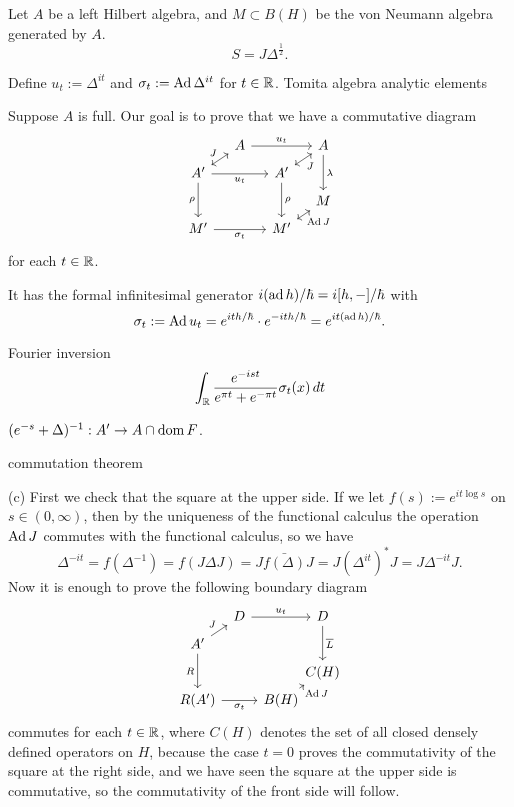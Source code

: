 \documentclass{../../large}
\begin{document}
\begin{prb}
Let $A$ be a left Hilbert algebra, and $M\subset B(H)$ be the von Neumann algebra generated by $A$.
\[S=J\Delta^{\frac12}.\]


Define $u_t:=\Delta^{it}$ and $\sigma_t:=\operatorname{Ad}\Delta^{it}$ for $t\in\mathbb{R}$.
Tomita algebra
analytic elements


Suppose $A$ is full.
Our goal is to prove that we have a commutative diagram
\[\begin{tikzcd}[column sep={30,between origins},row sep={20,between origins}]
&A\ar{rr}{u_t}&&A\ar{dd}{\lambda}\\
A'\ar[<->]{ur}{J}\ar[swap]{rr}{u_t}\ar[swap]{dd}{\rho}&&A'\ar[<->,swap]{ur}{J}\ar{dd}{\rho}&\\
&&&M\\
M'\ar[swap]{rr}{\sigma_t}&&M'\ar[<->,swap]{ur}{\Ad J}&
\end{tikzcd}\]
for each $t\in\mathbb{R}$.

It has the formal infinitesimal generator $i(\operatorname{ad} h)/\hbar=i[h,-]/\hbar$ with
\[\sigma_t:=\operatorname{Ad} u_t=e^{ith/\hbar}\cdot e^{-ith/\hbar}=e^{it(\operatorname{ad} h)/\hbar}.\]





\begin{parts}
\item Fourier inversion
\[\int_{\mathbb{R}}\frac{e^{-ist}}{e^{\pi t}+e^{-\pi t}}\sigma_t(x)\,dt\]
\item $(e^{-s}+\Delta)^{-1}:A'\to A\cap\operatorname{dom} F$.
\item commutation theorem
\end{parts}
\end{prb}
\begin{pf}
(c)
First we check that the square at the upper side.
If we let $f(s):=e^{it\log s}$ on $s\in(0,\infty)$, then by the uniqueness of the functional calculus the operation $\operatorname{Ad} J$ commutes with the functional calculus, so we have
\[\Delta^{-it}=f(\Delta^{-1})=f(J\Delta J)=J\bar{f(\Delta)}J=J(\Delta^{it})^*J=J\Delta^{-it}J.\]
Now it is enough to prove the following boundary diagram
\[\begin{tikzcd}[column sep={30,between origins},row sep={20,between origins}]
&D\ar{rr}{u_t}&&D\ar{dd}{\bar L}\\
A'\ar{ur}{J}\ar[swap]{dd}{R}&&&\\
&&&C(H)\\
R(A')\ar[swap]{rr}{\sigma_t}&&B(H)\ar[swap]{ur}{\Ad J}&
\end{tikzcd}\]
commutes for each $t\in\mathbb{R}$, where $C(H)$ denotes the set of all closed densely defined operators on $H$, because the case $t=0$ proves the commutativity of the square at the right side, and we have seen the square at the upper side is commutative, so the commutativity of the front side will follow.



\end{pf}
\end{document}
